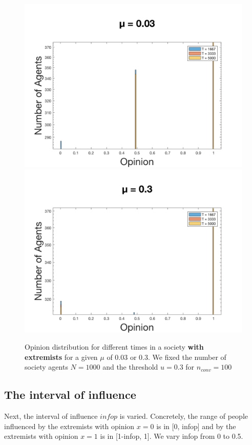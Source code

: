 \documentclass[11pt]{article}
\begin{document}
\begin{figure}[!htb]
  \includegraphics[width=\linewidth]{gen_plot_geil_klein_mu.png}
\endminipage\hfill
{}
  \includegraphics[width=\linewidth]{gen_plot_geil_gross_mu.png}
\endminipage
\caption{Opinion distribution for different times in a society \textbf{with extremists} for a given $\mu$ of 0.03 or 0.3. We fixed the number of society agents $N = 1000$ and the threshold $u = 0.3$ for $n_{conv} = 100$}
\label{fig:muwithextremists2}
\end{figure}


\subsection{The interval of influence}
Next, the interval of influence $infop$ is varied. Concretely, the range of people influenced by the extremists with opinion $x=0$ is in [0, infop] and by the extremists with opinion $x=1$ is in [1-infop, 1]. We vary infop from 0 to 0.5. 
\end{document}
